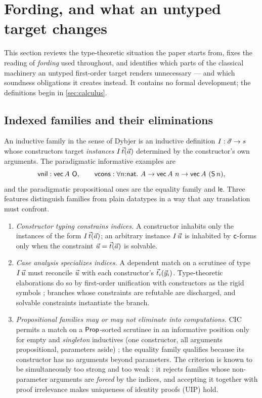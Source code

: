 \section{Fording, and what an untyped target changes}
\label{sec:fording}

This section reviews the type-theoretic situation the paper starts from,
fixes the reading of \emph{fording} used throughout, and identifies which
parts of the classical machinery an untyped first-order target renders
unnecessary --- and which soundness obligations it creates instead.  It
contains no formal development; the definitions begin in
\cref{sec:calculus}.

\subsection{Indexed families and their eliminations}
\label{sec:fording-families}

An inductive family in the sense of Dybjer \cite{Dybjer1994} is an
inductive definition $I : \vec{\sigma} \to s$ whose constructors target
\emph{instances} $I\,\vec{t}(\vec{a})$ determined by the constructor's own
arguments.  The paradigmatic informative examples are
\[
  \csvnil : \vect\,A\ \csO, \qquad
  \csvcons : \forall n{:}\nat.\ A \to \vect\,A\ n \to \vect\,A\ (\csS\,n),
\]
and the paradigmatic propositional ones are the equality family and
$\mathsf{le}$.  Three features distinguish families from plain datatypes
in a way that any translation must confront.

\begin{enumerate}[leftmargin=2em]
\item \emph{Constructor typing constrains indices.}  A constructor
  inhabits only the instances of the form $I\,\vec{t}(\vec{a})$; an
  arbitrary instance $I\,\vec{u}$ is inhabited by $\mathsf{c}$-forms only
  when the constraint $\vec{u} = \vec{t}(\vec{a})$ is solvable.
\item \emph{Case analysis specializes indices.}  A dependent match on a
  scrutinee of type $I\,\vec{u}$ must reconcile $\vec{u}$ with each
  constructor's $\vec{t}_i(\vec{y}_i)$.  Type-theoretic elaborations do so
  by first-order unification with constructors as the rigid symbols
  \cite{GoguenEtAl2006}; branches whose constraints are refutable are
  discharged, and solvable constraints instantiate the branch.
\item \emph{Propositional families may or may not eliminate into
  computations.}  CIC permits a match on a $\mathsf{Prop}$-sorted scrutinee in an
  informative position only for empty and \emph{singleton} inductives
  (one constructor, all arguments propositional, parameters aside)
  \cite{Rocq,Letouzey2003}; the equality family qualifies because its
  constructor has no arguments beyond parameters.  The criterion is known
  to be simultaneously too strong and too weak
  \cite{GilbertEtAl2019}: it rejects families whose non-parameter
  arguments are \emph{forced} by the indices, and accepting it together
  with proof irrelevance makes uniqueness of identity proofs (UIP) hold.
\end{enumerate}

